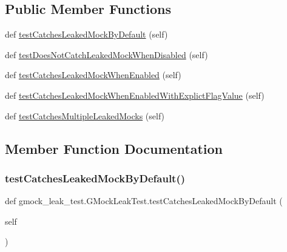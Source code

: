 \subsection*{Public Member Functions}
\begin{DoxyCompactItemize}
\item 
def \hyperlink{classgmock__leak__test_1_1_g_mock_leak_test_ad87d271de7b3f106e51272d6e9139c76}{test\+Catches\+Leaked\+Mock\+By\+Default} (self)
\item 
def \hyperlink{classgmock__leak__test_1_1_g_mock_leak_test_a3107bf5a603558ab2d97d88fb5589951}{test\+Does\+Not\+Catch\+Leaked\+Mock\+When\+Disabled} (self)
\item 
def \hyperlink{classgmock__leak__test_1_1_g_mock_leak_test_a78f4040a392d183597f71d92da8c1246}{test\+Catches\+Leaked\+Mock\+When\+Enabled} (self)
\item 
def \hyperlink{classgmock__leak__test_1_1_g_mock_leak_test_ab19cf302ea06e1b186bd6ab951d9161e}{test\+Catches\+Leaked\+Mock\+When\+Enabled\+With\+Explict\+Flag\+Value} (self)
\item 
def \hyperlink{classgmock__leak__test_1_1_g_mock_leak_test_a09465b2bfde98834e4bb9563c035f034}{test\+Catches\+Multiple\+Leaked\+Mocks} (self)
\end{DoxyCompactItemize}


\subsection{Member Function Documentation}
\mbox{\label{classgmock__leak__test_1_1_g_mock_leak_test_ad87d271de7b3f106e51272d6e9139c76}} 
\subsubsection{\texorpdfstring{test\+Catches\+Leaked\+Mock\+By\+Default()}{testCatchesLeakedMockByDefault()}}
{\footnotesize\ttfamily def gmock\+\_\+leak\+\_\+test.\+G\+Mock\+Leak\+Test.\+test\+Catches\+Leaked\+Mock\+By\+Default (\begin{DoxyParamCaption}\item[{}]{self }\end{DoxyParamCaption})}

